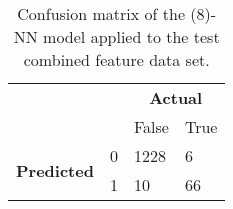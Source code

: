 \begin{table}[t!]
\centering
\begin{tabular}{llll}
                                                        &   & \multicolumn{2}{c}{\textbf{Actual}} \\
                                                        &   & False             & True            \\ \hline
\multicolumn{1}{c}{\multirow{2}{*}{\textbf{Predicted}}} & 0 & 1228              & 6               \\
\multicolumn{1}{c}{}                                    & 1 & 10                & 66              \\ \hline
\end{tabular}
\caption{Confusion matrix of the (8)-NN model applied to the test combined feature data set.}
\label{tab:ch3_nn_all}
\end{table}

